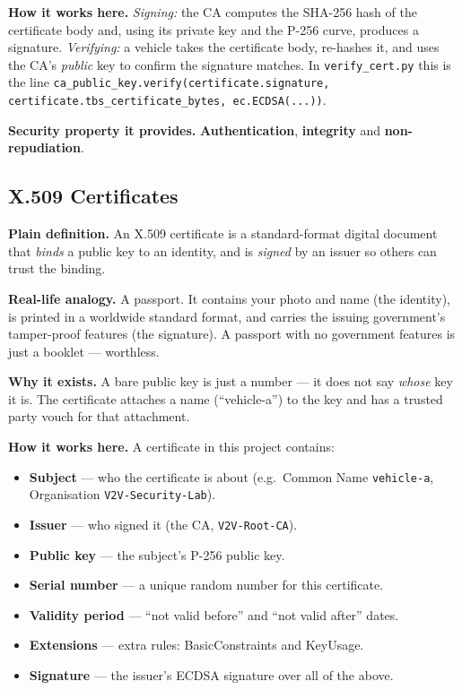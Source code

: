 \documentclass[11pt,a4paper]{report}
\begin{document}
\textbf{How it works here.} \emph{Signing:} the CA computes the SHA-256 hash of
the certificate body and, using its private key and the P-256 curve, produces a
signature. \emph{Verifying:} a vehicle takes the certificate body, re-hashes it,
and uses the CA's \emph{public} key to confirm the signature matches. In
\texttt{verify\_cert.py} this is the line
\texttt{ca\_public\_key.verify(certificate.signature,
certificate.tbs\_certificate\_bytes, ec.ECDSA(...))}.

\textbf{Security property it provides.} \textbf{Authentication},
\textbf{integrity} and \textbf{non-repudiation}.

\subsection{X.509 Certificates}
\textbf{Plain definition.} An X.509 certificate is a standard-format digital
document that \emph{binds} a public key to an identity, and is \emph{signed} by
an issuer so others can trust the binding.

\textbf{Real-life analogy.} A passport. It contains your photo and name (the
identity), is printed in a worldwide standard format, and carries the issuing
government's tamper-proof features (the signature). A passport with no government
features is just a booklet --- worthless.

\textbf{Why it exists.} A bare public key is just a number --- it does not say
\emph{whose} key it is. The certificate attaches a name (``vehicle-a'') to the
key and has a trusted party vouch for that attachment.

\textbf{How it works here.} A certificate in this project contains:
\begin{itemize}
  \item \textbf{Subject} --- who the certificate is about (e.g.\ Common Name
        \texttt{vehicle-a}, Organisation \texttt{V2V-Security-Lab}).
  \item \textbf{Issuer} --- who signed it (the CA, \texttt{V2V-Root-CA}).
  \item \textbf{Public key} --- the subject's P-256 public key.
  \item \textbf{Serial number} --- a unique random number for this certificate.
  \item \textbf{Validity period} --- ``not valid before'' and ``not valid
        after'' dates.
  \item \textbf{Extensions} --- extra rules: BasicConstraints and KeyUsage.
  \item \textbf{Signature} --- the issuer's ECDSA signature over all of the above.
\end{itemize}
\end{document}

